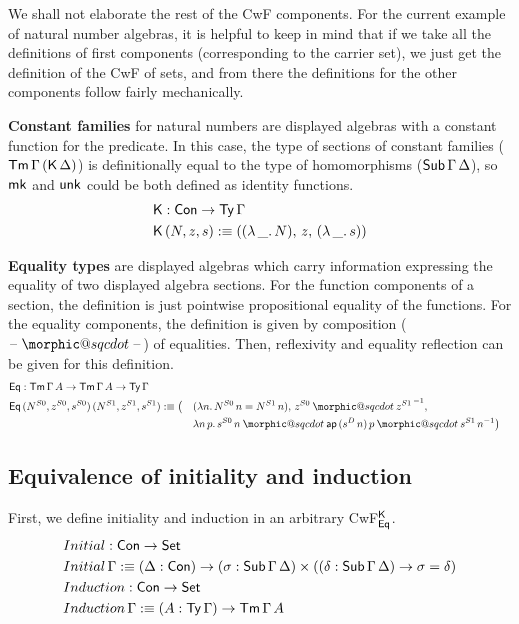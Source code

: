 \documentclass[acmsmall,review]{acmart}\settopmatter{printfolios=true,printccs=false,printacmref=false}
\makeatletter
\DeclareRobustCommand{\sqcdot}{\mathbin{\mathpalette\morphic@sqcdot\relax}}
\newcommand{\morphic@sqcdot}[2]{%
  \sbox\z@{$\m@th#1\centerdot$}%
  \ht\z@=.33333\ht\z@
  \vcenter{\box\z@}%
}
\makeatother
\begin{document}
We shall not elaborate the rest of the CwF components. For the current
example of natural number algebras, it is helpful to keep in mind that
if we take all the definitions of first components (corresponding to
the carrier set), we just get the definition of the CwF of sets, and
from there the definitions for the other components follow fairly
mechanically.

\textbf{Constant families} for natural numbers are displayed algebras
with a constant function for the predicate. In this case, the type of
sections of constant families ($\mathsf{Tm}\,\Gamma\,(\mathsf{K}\,\Delta)$) is
definitionally equal to the type of homomorphisms
($\mathsf{Sub}\,\Gamma\,\Delta$), so $\mathsf{mk}$ and $\mathsf{unk}$ could be both defined as
identity functions.
\begin{alignat*}{5}
  & \mathsf{K} : \mathsf{Con} \rightarrow \mathsf{Ty}\,\Gamma \\
  & \mathsf{K}\,(N, z, s) :\equiv ((\lambda\,\_.\,N),\,z,\,(\lambda\,\_.\,s))
\end{alignat*}

\textbf{Equality types} are displayed algebras which carry information
expressing the equality of two displayed algebra sections. For the
function components of a section, the definition is just pointwise
propositional equality of the functions. For the equality components,
the definition is given by composition ($\blank\sqcdot\blank$) of
equalities. Then, reflexivity and equality reflection can be given
for this definition.
\begin{alignat*}{5}
  & \Eq : \Tm\,\Gamma\,A\ra\Tm\,\Gamma\,A\ra\Ty\,\Gamma \\
  & \Eq\,(N^{S0},z^{S0},s^{S0})\,(N^{S1},z^{S1},s^{S1}) :\equiv \big( && (\lambda n.\,{N^{S0}}\,n = {N^{S1}}\,n),\,z^{S0}\sqcdot {z^{S1}}^{\,-1},\, \\
  & && \lambda n\,p.\,s^{S0}\,n\sqcdot \ap\,(s^D\,n)\,p\sqcdot s^{S1}\,n^{-1}\big)
\end{alignat*}

\subsection{Equivalence of initiality and induction}
\label{sec:initind}

First, we define initiality and induction in an arbitrary CwF$^{\mathsf{K}}_{\mathsf{Eq}}$.
\begin{alignat*}{5}
  & Initial : \mathsf{Con} \rightarrow \mathsf{Set} \\
  & Initial\,\Gamma :\equiv (\Delta : \mathsf{Con}) \rightarrow (\sigma : \mathsf{Sub}\,\Gamma\,\Delta)\times((\delta : \mathsf{Sub}\,\Gamma\,\Delta)\rightarrow\sigma=\delta) \\
  & Induction : \mathsf{Con} \rightarrow \mathsf{Set} \\
  & Induction\,\Gamma :\equiv (A : \mathsf{Ty}\,\Gamma)\rightarrow\mathsf{Tm}\,\Gamma\,A
\end{alignat*}
\end{document}
